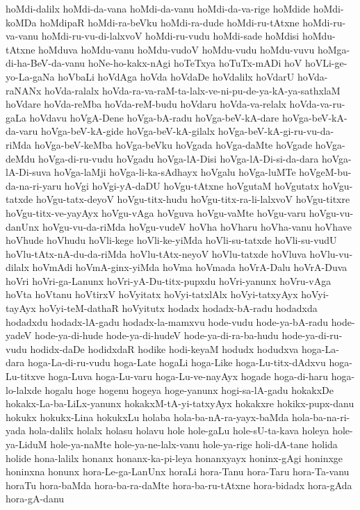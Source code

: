 {hoMdi-dalilx
hoMdi-da-vana
hoMdi-da-vanu
hoMdi-da-va-rige
hoMdide
hoMdi-koMDa
hoMdipaR
hoMdi-ra-beVku
hoMdi-ra-dude
hoMdi-ru-tAtxne
hoMdi-ru-va-vanu
hoMdi-ru-vu-di-lalxvoV
hoMdi-ru-vudu
hoMdi-sade
hoMdisi
hoMdu-tAtxne
hoMduva
hoMdu-vanu
hoMdu-vudoV
hoMdu-vudu
hoMdu-vuvu
hoMga-di-ha-BeV-da-vanu
hoNe-ho-kakx-nAgi
hoTeTxya
hoTuTx-mADi
hoV
hoVLi-ge-yo-La-gaNa
hoVbaLi
hoVdAga
hoVda
hoVdaDe
hoVdalilx
hoVdarU
hoVda-raNANx
hoVda-ralalx
hoVda-ra-va-raM-ta-lalx-ve-ni-pu-de-ya-kA-ya-sathxlaM
hoVdare
hoVda-reMba
hoVda-reM-budu
hoVdaru
hoVda-va-relalx
hoVda-va-ru-gaLa
hoVdavu
hoVgA-Dene
hoVga-bA-radu
hoVga-beV-kA-dare
hoVga-beV-kA-da-varu
hoVga-beV-kA-gide
hoVga-beV-kA-gilalx
hoVga-beV-kA-gi-ru-vu-da-riMda
hoVga-beV-keMba
hoVga-beVku
hoVgada
hoVga-daMte
hoVgade
hoVga-deMdu
hoVga-di-ru-vudu
hoVgadu
hoVga-lA-Disi
hoVga-lA-Di-si-da-dara
hoVga-lA-Di-suva
hoVga-laMji
hoVga-li-ka-sAdhayx
hoVgalu
hoVga-luMTe
hoVgeM-bu-da-na-ri-yaru
hoVgi
hoVgi-yA-daDU
hoVgu-tAtxne
hoVgutaM
hoVgutatx
hoVgu-tatxde
hoVgu-tatx-deyoV
hoVgu-titx-hudu
hoVgu-titx-ra-li-lalxvoV
hoVgu-titxre
hoVgu-titx-ve-yayAyx
hoVgu-vAga
hoVguva
hoVgu-vaMte
hoVgu-varu
hoVgu-vu-danUnx
hoVgu-vu-da-riMda
hoVgu-vudeV
hoVha
hoVharu
hoVha-vanu
hoVhave
hoVhude
hoVhudu
hoVli-kege
hoVli-ke-yiMda
hoVli-su-tatxde
hoVli-su-vudU
hoVlu-tAtx-nA-du-da-riMda
hoVlu-tAtx-neyoV
hoVlu-tatxde
hoVluva
hoVlu-vu-dilalx
hoVmAdi
hoVmA-ginx-yiMda
hoVma
hoVmada
hoVrA-Dalu
hoVrA-Duva
hoVri
hoVri-ga-Lanunx
hoVri-yA-Du-titx-pupxdu
hoVri-yanunx
hoVru-vAga
hoVta
hoVtanu
hoVtirxV
hoVyitatx
hoVyi-tatxlAlx
hoVyi-tatxyAyx
hoVyi-tayAyx
hoVyi-teM-dathaR
hoVyitutx
hodadx
hodadx-bA-radu
hodadxda
hodadxdu
hodadx-lA-gadu
hodadx-la-mamxvu
hode-vudu
hode-ya-bA-radu
hode-yadeV
hode-ya-di-hude
hode-ya-di-hudeV
hode-ya-di-ra-ba-hudu
hode-ya-di-ru-vudu
hodidx-daDe
hodidxdaR
hodike
hodi-keyaM
hodudx
hodudxva
hoga-La-dara
hoga-La-di-ru-vudu
hoga-Late
hogaLi
hoga-Like
hoga-Lu-titx-dAdxvu
hoga-Lu-titxve
hoga-Luva
hoga-Lu-varu
hoga-Lu-ve-nayAyx
hogade
hoga-di-haru
hoga-lo-lalxde
hogalu
hoge
hogenu
hogeya
hoge-yanunx
hogi-sa-lA-gadu
hokakxDe
hokakx-La-ba-LiLx-yanunx
hokakxM-tA-yi-tatxyAyx
hokakxre
hokikx-pupx-danu
hokukx
hokukx-Lina
hokukxLu
holaba
hola-ba-nA-ra-yayx-baMda
hola-ba-na-ri-yada
hola-dalilx
holalx
holasu
holavu
hole
hole-gaLu
hole-sU-ta-kava
holeya
hole-ya-LiduM
hole-ya-naMte
hole-ya-ne-lalx-vanu
hole-ya-rige
holi-dA-tane
holida
holide
hona-lalilx
honanx
honanx-ka-pi-leya
honanxyayx
honinx-gAgi
honinxge
honinxna
honunx
hora-Le-ga-LanUnx
horaLi
hora-Tanu
hora-Taru
hora-Ta-vanu
horaTu
hora-baMda
hora-ba-ra-daMte
hora-ba-ru-tAtxne
hora-bidadx
hora-gAda
hora-gA-danu
}
